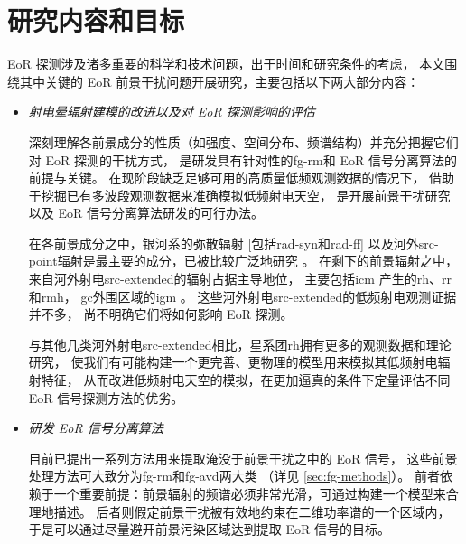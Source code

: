 \section{研究内容和目标}

EoR 探测涉及诸多重要的科学和技术问题，出于时间和研究条件的考虑，
本文围绕其中关键的 EoR 前景干扰问题开展研究，主要包括以下两大部分内容：

\begin{itemize}
\item \emph{射电晕辐射建模的改进以及对 EoR 探测影响的评估}

\hspace{2\ccwd}%
深刻理解各前景成分的性质（如强度、空间分布、频谱结构）并充分把握它们对 EoR 探测的干扰方式，
是研发具有针对性的\ac{fg-rm}和 EoR 信号分离算法的前提与关键。
在现阶段缺乏足够可用的高质量低频观测数据的情况下，
借助于挖掘已有多波段观测数据来准确模拟低频射电天空，
是开展前景干扰研究以及 EoR 信号分离算法研发的可行办法。

\hspace{2\ccwd}%
在各前景成分之中，银河系的弥散辐射 [包括\ac{rad-syn}和\ac{rad-ff}]
以及河外\ac{src-point}辐射是最主要的成分，已被比较广泛地研究
\cite{shaver1999,diMatteo2004,gleser2008,liu2012,murray2017,spinelli2018}。
在剩下的前景辐射之中，来自河外射电\ac{src-extended}的辐射占据主导地位，
主要包括\ac{icm} \cite{feretti2012} 产生的\ac{rh}、\ac{rr}和\ac{rmh}，
\ac{gc}外围区域的\ac{igm} \cite{keshet2004}。
这些河外射电\ac{src-extended}的低频射电观测证据并不多，
尚不明确它们将如何影响 EoR 探测。

\hspace{2\ccwd}%
与其他几类河外射电\ac{src-extended}相比，星系团\ac{rh}拥有更多的观测数据和理论研究，
使我们有可能构建一个更完善、更物理的模型用来模拟其低频射电辐射特征，
从而改进低频射电天空的模拟，在更加逼真的条件下定量评估不同 EoR 信号探测方法的优劣。

\item \emph{研发 EoR 信号分离算法}

\hspace{2\ccwd}%
目前已提出一系列方法用来提取淹没于前景干扰之中的 EoR 信号，
这些前景处理方法可大致分为\ac{fg-rm}和\ac{fg-avd}两大类 \cite{chapman2016}
（详见 \autoref{sec:fg-methods}）。
前者依赖于一个重要前提：前景辐射的频谱必须非常光滑，可通过构建一个模型来合理地描述。
后者则假定前景干扰被有效地约束在二维功率谱的一个区域内，
于是可以通过尽量避开前景污染区域达到提取 EoR 信号的目标。


\end{itemize}
